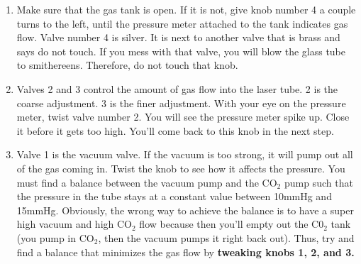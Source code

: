 \documentclass{../lab}
\begin{document}
\begin{enumerate}
    \item Make sure that the gas tank is open. If it is not, give knob number 4 a couple turns to the left, until the pressure meter attached to the tank indicates gas flow. Valve number 4 is silver. It is next to another valve that is brass and says do not touch. If you mess with that valve, you will blow the glass tube to smithereens. Therefore, do not touch that knob.
    
    \item Valves 2 and 3 control the amount of gas flow into the laser tube. 2 is the coarse adjustment. 3 is the finer adjustment. With your eye on the pressure meter, twist valve number 2. You will see the pressure meter spike up. Close it before it gets too high. You'll come back to this knob in the next step.
    
    \item Valve 1 is the vacuum valve. If the vacuum is too strong, it will pump out all of the gas coming in. Twist the knob to see how it affects the pressure. You must find a balance between the vacuum pump and the CO$_2$ pump such that the pressure in the tube stays at a constant value between 10mmHg and 15mmHg. Obviously, the wrong way to achieve the balance is to have a super high vacuum and high CO$_2$ flow because then you'll empty out the C0$_2$ tank (you pump in CO$_2$, then the vacuum pumps it right back out).  Thus, try and find a balance that minimizes the gas flow by \textbf{tweaking knobs 1, 2, and 3.}





\end{enumerate}
\end{document}
